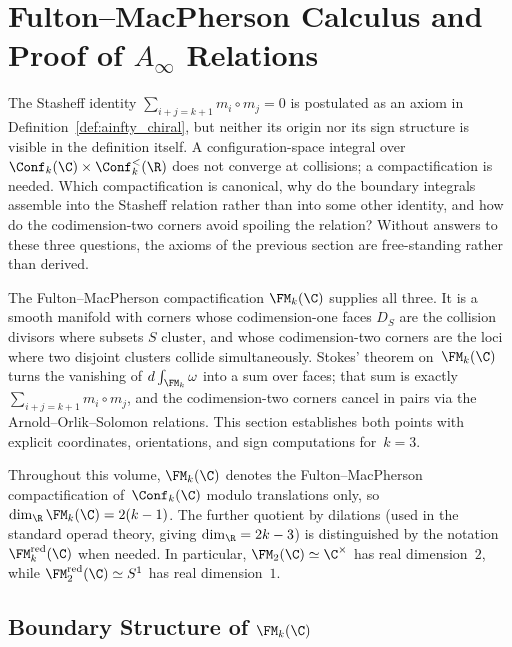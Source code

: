 \section{\texorpdfstring{Fulton--MacPherson Calculus and Proof of $A_\infty$ Relations}{Fulton--MacPherson Calculus and Proof of A-infinity Relations}}
\label{sec:FM_calculus}

The Stasheff identity
$\sum_{i+j = k+1} m_i \circ m_j = 0$ is postulated as an axiom
in Definition~\ref{def:ainfty_chiral}, but neither its origin
nor its sign structure is visible in the definition itself. A
configuration-space integral over $\Conf_k(\C) \times
\Conf_k^{<}(\R)$ does not converge at collisions; a
compactification is needed. Which compactification is
canonical, why do the boundary integrals assemble into the
Stasheff relation rather than into some other identity, and how
do the codimension-two corners avoid spoiling the relation?
Without answers to these three questions, the axioms of the
previous section are free-standing rather than derived.

The Fulton--MacPherson compactification $\FM_k(\C)$ supplies
all three. It is a smooth manifold with corners whose
codimension-one faces $D_S$ are the collision divisors where
subsets $S$ cluster, and whose codimension-two corners are the
loci where two disjoint clusters collide simultaneously.
Stokes' theorem on~$\FM_k(\C)$ turns the vanishing of
$d\int_{\FM_k} \omega$ into a sum over faces; that sum is
exactly $\sum_{i+j = k+1} m_i \circ m_j$, and the
codimension-two corners cancel in pairs via the
Arnold--Orlik--Solomon relations. This section establishes
both points with explicit coordinates, orientations, and sign
computations for~$k = 3$.

\begin{remark}
\label{rem:FM-convention}
Throughout this volume, $\FM_k(\C)$ denotes the Fulton--MacPherson compactification of~$\Conf_k(\C)$ modulo translations only, so $\dim_\R \FM_k(\C) = 2(k-1)$. The further quotient by dilations (used in the standard operad theory, giving $\dim_\R = 2k-3$) is distinguished by the notation $\FM_k^{\mathrm{red}}(\C)$ when needed. In particular, $\FM_2(\C) \simeq \C^\times$ has real dimension~$2$, while $\FM_2^{\mathrm{red}}(\C) \simeq S^1$ has real dimension~$1$.
\end{remark}

\subsection{\texorpdfstring{Boundary Structure of $\FM_k(\C)$}{Boundary Structure of FM k(C)}}

